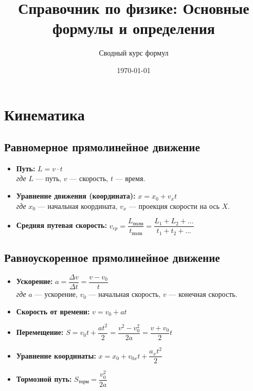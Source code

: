 \documentclass[11pt, a4paper]{article}
\title{\textbf{\Large Справочник по физике: Основные формулы и определения}}
\author{Сводный курс формул}
\date{\today}
\begin{document}
\maketitle

\tableofcontents
\newpage

\section{Кинематика}

\subsection{Равномерное прямолинейное движение}
\begin{itemize}
    \item \textbf{Путь:} $L = v \cdot t$ \\
    \textit{где} $L$ --- путь, $v$ --- скорость, $t$ --- время.
    
    \item \textbf{Уравнение движения (координата):} $x = x_0 + v_x t$ \\
    \textit{где} $x_0$ --- начальная координата, $v_x$ --- проекция скорости на ось $X$.
    
    \item \textbf{Средняя путевая скорость:} $v_{cp} = \dfrac{L_{\text{полн}}}{t_{\text{полн}}} = \dfrac{L_1 + L_2 + \dots}{t_1 + t_2 + \dots}$
\end{itemize}

\subsection{Равноускоренное прямолинейное движение}
\begin{itemize}
    \item \textbf{Ускорение:} $a = \dfrac{\Delta v}{\Delta t} = \dfrac{v - v_0}{t}$ \\
    \textit{где} $a$ --- ускорение, $v_0$ --- начальная скорость, $v$ --- конечная скорость.
    
    \item \textbf{Скорость от времени:} $v = v_0 + at$
    
    \item \textbf{Перемещение:} $S = v_0 t + \dfrac{at^2}{2} = \dfrac{v^2 - v_0^2}{2a} = \dfrac{v + v_0}{2} t$
    
    \item \textbf{Уравнение координаты:} $x = x_0 + v_{0x} t + \dfrac{a_x t^2}{2}$
    
    \item \textbf{Тормозной путь:} $S_{\text{торм}} = \dfrac{v_0^2}{2a}$
\end{itemize}
\end{document}
